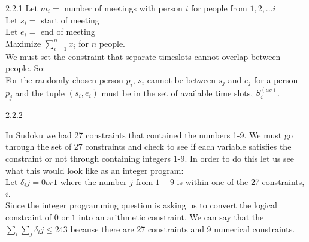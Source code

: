 \documentclass[11pt,letterpaper]{article}
\begin{document}
\begin{description}
\item{2.2.1}
  Let $m_i =$ number of meetings with person $i$ for people from $1, 2, ... i$\\
  Let $s_i =$ start of meeting\\
  Let $e_i =$ end of meeting\\

Maximize $\sum_{i = 1}^n x_i$ for $n$ people.\\
We must set the constraint that separate timeslots cannot overlap
between people. So:\\
For the randomly chosen person $p_i$, $s_i$ cannot be between $s_j$
and $e_j$ for a person $p_j$ and the tuple $(s_i, e_i)$ must be in the
set of available time slots, $S^{(av)}_i$.\\

\item{2.2.2}

In Sudoku we had 27 constraints that contained the numbers 1-9.  We
must go through the set of 27 constraints and check to see if each
variable satisfies the constraint or not through containing integers 1-9.  In order to do this let us
see what this would look like as an integer program:\\

Let $\delta_ij = 0 or 1$ where the number $j$ from $1-9$ is within one
of the 27 constraints, $i$.\\
Since the integer programming question is asking us to convert the
logical constraint of $0$ or $1$ into an arithmetic constraint. We can
say that the $\sum_i \sum_j \delta_ij \le 243$ because there are 27
constraints and 9 numerical constraints. \\
\end{description}
\end{document}
